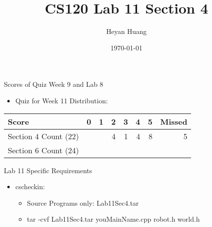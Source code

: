 \documentclass[presentation]{beamer}
\author{Heyan Huang}
\date{\today}
\title{CS120 Lab \alert{11} Section \alert{4}}
\begin{document}
\maketitle

\begin{frame}[label=sec-1]{Scores of Quiz Week 9 and Lab 8}
\\
\begin{itemize}
\item \alert{Quiz for Week 11} Distribution:
\end{itemize}
\begin{center}
\begin{tabular}{lrrrrrrr}
\hline
Score & 0 & 1 & 2 & 3 & 4 & 5 & Missed\\
\hline
Section \alert{4} Count (22) &  &  & 4 & 1 & 4 & 8 & 5\\
\hline
Section \alert{6} Count (24) &  &  &  &  &  &  & \\
\hline
\end{tabular}
\end{center}
\end{frame}

\begin{frame}[label=sec-2]{Lab 11 Specific Requirements}
\begin{itemize}
\item cscheckin: 
\begin{itemize}
\item \alert{Source Programs} only: \alert{Lab11Sec4.tar}
\item \alert{tar -cvf Lab11Sec4.tar youMainName.cpp robot.h world.h}
\end{itemize}
\end{itemize}
\end{frame}
\end{document}

